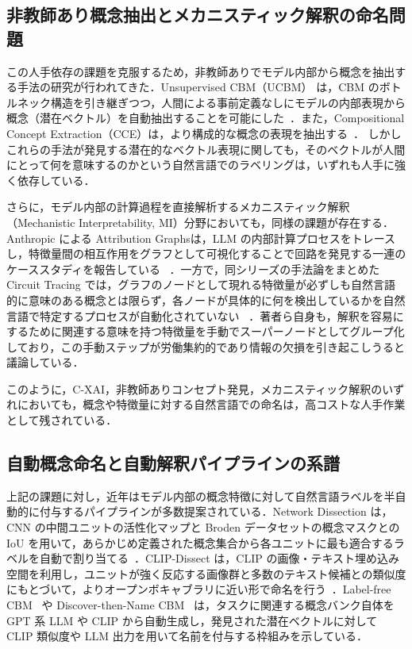 \subsection{非教師あり概念抽出とメカニスティック解釈の命名問題}

この人手依存の課題を克服するため，非教師ありでモデル内部から概念を抽出する手法の研究が行われてきた．Unsupervised CBM（UCBM） は，CBM のボトルネック構造を引き継ぎつつ，人間による事前定義なしにモデルの内部表現から概念（潜在ベクトル）を自動抽出することを可能にした~\cite{schrodi2024unsupervised}．また，Compositional Concept Extraction（CCE）は，より構成的な概念の表現を抽出する~\cite{stein2024towards}．
しかしこれらの手法が発見する潜在的なベクトル表現に関しても，そのベクトルが人間にとって何を意味するのかという自然言語でのラベリングは，いずれも人手に強く依存している．

さらに，モデル内部の計算過程を直接解析するメカニスティック解釈（Mechanistic Interpretability, MI）分野においても，同様の課題が存在する．Anthropic による Attribution Graphsは，LLM の内部計算プロセスをトレースし，特徴量間の相互作用をグラフとして可視化することで回路を発見する一連のケーススタディを報告している~\cite{anthropic2025biology} ．一方で，同シリーズの手法論をまとめた Circuit Tracing では，グラフのノードとして現れる特徴量が必ずしも自然言語的に意味のある概念とは限らず，各ノードが具体的に何を検出しているかを自然言語で特定するプロセスが自動化されていない~\cite{ameisen2025attribution} ．著者ら自身も，解釈を容易にするために関連する意味を持つ特徴量を手動でスーパーノードとしてグループ化しており，この手動ステップが労働集約的であり情報の欠損を引き起こしうると議論している．

このように，C-XAI，非教師ありコンセプト発見，メカニスティック解釈のいずれにおいても，概念や特徴量に対する自然言語での命名は，高コストな人手作業として残されている．

\subsection{自動概念命名と自動解釈パイプラインの系譜}

上記の課題に対し，近年はモデル内部の概念特徴に対して自然言語ラベルを半自動的に付与するパイプラインが多数提案されている．Network Dissection は，CNN の中間ユニットの活性化マップと Broden データセットの概念マスクとの IoU を用いて，あらかじめ定義された概念集合から各ユニットに最も適合するラベルを自動で割り当てる~\cite{bau2017networkdissection}．CLIP-Dissect は，CLIP の画像・テキスト埋め込み空間を利用し，ユニットが強く反応する画像群と多数のテキスト候補との類似度にもとづいて，よりオープンボキャブラリに近い形で命名を行う~\cite{oikarinen2022clipdissect}．Label-free CBM~\cite{oikarinen2023labelfree} や Discover-then-Name CBM~\cite{rao2024discoverthenname} は，タスクに関連する概念バンク自体を GPT 系 LLM や CLIP から自動生成し，発見された潜在ベクトルに対して CLIP 類似度や LLM 出力を用いて名前を付与する枠組みを示している．


